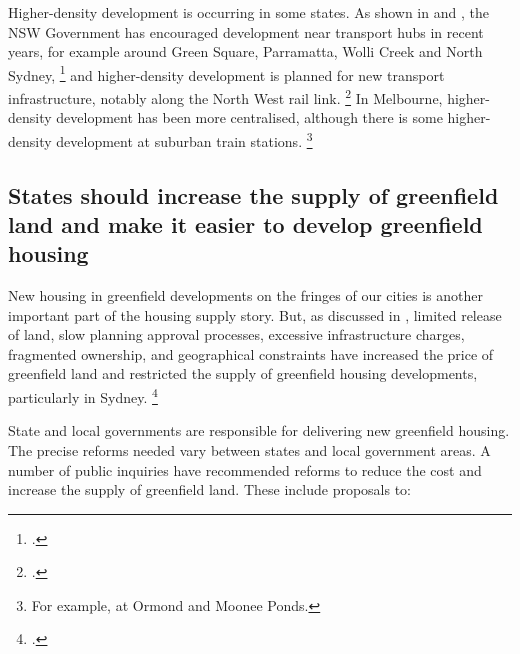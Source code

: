Higher-density development is occurring in some states.
As shown in  and , the NSW Government has encouraged development near transport hubs in recent years, for example around Green Square, Parramatta, Wolli Creek and North Sydney,%
	\footcites{KentPhibbs2017Charts}{RLB2017CraneIndex}[][8,72]{NSW-DPE-2014-Plan-for-growing-Syd}[][70--71]{Gurran-etal-Politics-planning-housing-supply-England-HongKong} and higher-density development is planned for new transport infrastructure, notably along the North West rail link.%
	\footcite[][10]{NSWNorthWestRail2013}
In Melbourne, higher-density development has been more centralised, although there is some higher-density development at suburban train stations.%
	\footnote{For example, at Ormond and Moonee Ponds.}

\subsection{States should increase the supply of greenfield land and make it easier to develop greenfield housing}\label{subsec:states-should-increase-the-supply-of-greenfield-land-and-reduce-the-time-and-costs-to-supply-new-greenfield-lots}

New housing in greenfield developments on the fringes of our cities is another important part of the housing supply story.
But, as discussed in , limited release of land, slow planning approval processes, excessive infrastructure charges, fragmented ownership, and geographical constraints have increased the price of greenfield land and restricted the supply of greenfield housing developments, particularly in Sydney.%
	\footcites{Kendall_Tulip_2018_zoning}{GlaeserGyourko2017EconImplications}{HsiehEtAlSupply2012}{Urbis2011Housing}{Property-Council-2016-Delays-costing-new-homebuyers}{UDIA-201718-PreBudget-submission}

State and local governments are responsible for delivering new greenfield housing.
The precise reforms needed vary between states and local government areas.
A number of public inquiries have recommended reforms to reduce the cost and increase the supply of greenfield land.
These include proposals to:

